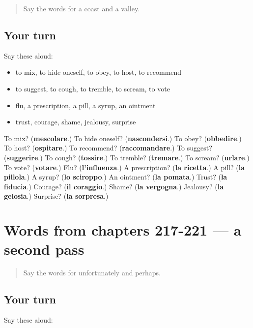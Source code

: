 \label{lesson:IT-R221-first-pass-words-from-chapters-213-216}



\begin{quote}
Say the words for a coast and a valley.
\end{quote}

\subsection*{Your turn}
Say these aloud:

\begin{itemize}
\raggedright
  \item to mix, to hide oneself, to obey, to host, to recommend
  \item to suggest, to cough, to tremble, to scream, to vote
  \item flu, a prescription, a pill, a syrup, an ointment
  \item trust, courage, shame, jealousy, surprise
\end{itemize}

\begin{tcolorbox}[breakable,colback=teal!4,colframe=teal!35!black,title={Before you move on}]
To mix? (\textbf{mescolare}.) To hide oneself? (\textbf{nascondersi}.) To obey? (\textbf{obbedire}.) To host? (\textbf{ospitare}.) To recommend? (\textbf{raccomandare}.) To suggest? (\textbf{suggerire}.) To cough? (\textbf{tossire}.) To tremble? (\textbf{tremare}.) To scream? (\textbf{urlare}.) To vote? (\textbf{votare}.) Flu? (\textbf{l'influenza}.) A prescription? (\textbf{la ricetta}.) A pill? (\textbf{la pillola}.) A syrup? (\textbf{lo sciroppo}.) An ointment? (\textbf{la pomata}.) Trust? (\textbf{la fiducia}.) Courage? (\textbf{il coraggio}.) Shame? (\textbf{la vergogna}.) Jealousy? (\textbf{la gelosia}.) Surprise? (\textbf{la sorpresa}.)
\end{tcolorbox}
\section[(dialogue)]{Words from chapters 217-221 — a second pass}

\label{lesson:IT-R221-second-pass-words-from-chapters-217-221}



\begin{quote}
Say the words for unfortunately and perhaps.
\end{quote}

\subsection*{Your turn}
Say these aloud:

